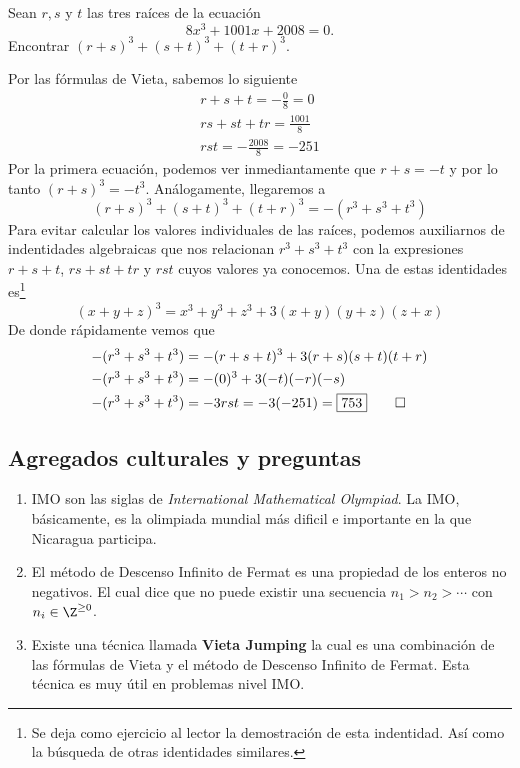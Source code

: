 \begin{section-example.tcb}[2008 AIME II \#7]
    Sean $r, s$ y $t$ las tres raíces de la ecuación
    \[8x^3 + 1001x + 2008 = 0.\]
    Encontrar $(r + s)^3 + (s + t)^3 + (t + r)^3.$
\end{section-example.tcb}
\begin{solution}
    Por las fórmulas de Vieta, sabemos lo siguiente
    \begin{gather*}
        r +  s + t = - \frac{0}{8} = 0 \\
        rs +  st + tr = \frac{1001}{8} \\
        r s t = - \frac{2008}{8} = -251
    \end{gather*}
    Por la primera ecuación, podemos ver inmediantamente que $r + s = -t$ y por lo tanto $(r + s)^3 = - t^3$.
    Análogamente, llegaremos a
    \[(r + s)^3 + (s + t)^3 + (t + r)^3 =  -(r^3 + s^3 + t^3)\]
    Para evitar calcular los valores individuales de las raíces, podemos auxiliarnos de indentidades algebraicas
    que nos relacionan $r^3 + s^3 + t^3$ con la expresiones $r +  s + t$, $rs +  st + tr$ y $rst$ cuyos valores ya conocemos.
    Una de estas identidades es\footnote{Se deja como ejercicio al lector la demostración de esta indentidad. Así como la búsqueda de otras identidades similares.}
    \[(x + y + z)^3 = x^3 + y^3 + z^3 + 3(x + y)(y + z)(z + x)\]
    De donde rápidamente vemos que
    \begin{align*}
        -(r^3 + s^3 + t^3) &= - (r + s + t)^3 + 3(r + s)(s + t)(t + r)\\
        -(r^3 + s^3 + t^3) &= -(0)^3 + 3(-t)(-r)(-s)\\
        -(r^3 + s^3 + t^3) &= - 3rst = -3(-251) = \boxed{753} \qedhere
    \end{align*}
\end{solution}



\subsection{Agregados culturales y preguntas}

\begin{enumerate}
    \item IMO son las siglas de \textit{International Mathematical Olympiad}. La IMO, básicamente, es la olimpiada mundial más dificil e importante en la que Nicaragua participa.
    \item El método de Descenso Infinito de Fermat es una propiedad de los enteros no negativos. El cual dice que no puede existir una secuencia $n_1 > n_2 > \cdots$ con $n_i \in \Z^{\geq 0}$.
    \item Existe una técnica llamada \textbf{Vieta Jumping} la cual es una combinación de las fórmulas de Vieta y el método de Descenso Infinito de Fermat.
    Esta técnica es muy útil en problemas nivel IMO.
\end{enumerate}

